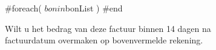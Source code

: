 \documentclass{factuur}
\begin{document}

\begin{reparatiesTable}[$Valuta]
	#foreach( $bon in $bonList )
	#end
\end{reparatiesTable}


\vfill
\begin{center}
	Wilt u het bedrag van deze factuur binnen 14 dagen na\\
	factuurdatum overmaken op bovenvermelde rekening.
\end{center}
\end{document}
